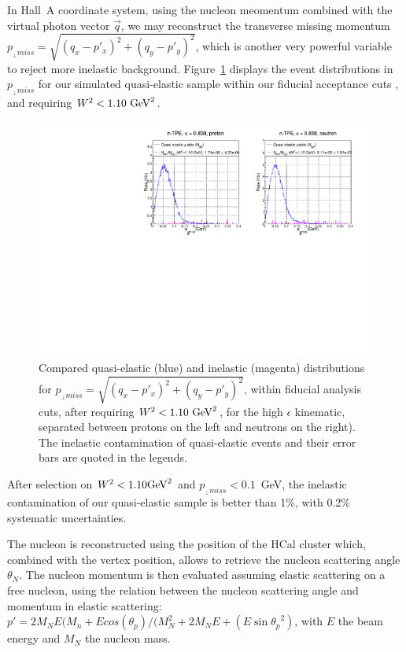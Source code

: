 \documentclass[11pt]{article}
\begin{document}
In Hall~A coordinate system, using the nucleon meomentum combined with the virtual photon vector $\vec{q}$, we may reconstruct the transverse missing momentum $p_{_{\perp} miss} = \sqrt{(q_{x}-p'_{x})^2+(q_{y}-p'_{y})^2}$, which is another very powerful variable to reject more inelastic background.
Figure~\ref{fig:pperp} displays the event distributions in $p_{_{\perp} miss}$ for our simulated quasi-elastic sample within our fiducial acceptance cuts%
, and requiring $W^2<1.10~{\rm GeV}^2$.
%
\begin{figure}[h]
  \centering
    \includegraphics[width=12cm]{gen-tpe_he_pperp_acc_real_new.pdf}
    \caption{Compared quasi-elastic (blue) and inelastic (magenta) distributions for $p_{_{\perp} miss} = \sqrt{(q_{x}-p'_{x})^2+(q_{y}-p'_{y})^2}$, within fiducial analysis cuts, after requiring $W^2<1.10~{\rm GeV}^2$, for the high $\epsilon$ kinematic, separated between protons on the left and neutrons on the right). The inelastic contamination of quasi-elastic events and their error bars are quoted in the legends.}
    \label{fig:pperp}
\end{figure}
%
After selection on $W^2 <1.10 {\rm GeV}^2$ and $p_{_{\perp} miss} <0.1$~GeV, the inelastic contamination of our quasi-elastic sample is better than 1\%, with 0.2\% systematic uncertainties.

\iffalse
The nucleon is reconstructed using the position of the HCal cluster which, combined with the vertex position, allows to retrieve the nucleon scattering angle $\theta_N$.
The nucleon momentum is then evaluated assuming elastic scattering on a free nucleon, using the relation between the nucleon scattering angle and momentum in elastic scattering:
$p' = 2M_N E (M_n+E cos(\theta_p)/(M_N^2+2M_N E+(E \sin{\theta_p}^2)$, with $E$ the beam energy and $M_N$ the nucleon mass.
\end{document}
